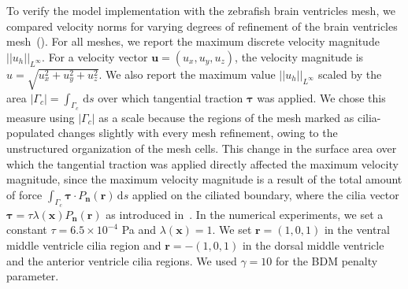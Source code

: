\documentclass[fleqn]{wlscirep}
\newcommand{\normlinf}[1]{{\vert\vert#1\vert\vert}_{L^{\infty}}}
\newcommand{\intGc}[1]{\int_{\Gamma_c}#1 \, \mathrm ds}
\newcommand{\Gc}{\Gamma_{c}}
\newcommand{\nn}{\mathbf{n}}
\newcommand{\rr}{\mathbf{r}}
\newcommand{\uu}{\mathbf{u}}
\newcommand{\xx}{\bm{x}}
\newcommand{\btau}{\bm{\tau}}
\begin{document}
To verify the model implementation with the zebrafish brain ventricles mesh,
we compared velocity norms for varying degrees of refinement of the brain ventricles mesh~().
For all meshes, we report the maximum discrete velocity magnitude $\normlinf{u_h}$.
For a velocity vector $\uu=(u_x, u_y, u_z)$, the velocity magnitude is
$u = \sqrt{u_x^2 + u_y^2 + u_z^2}$. We also report the maximum value
$\normlinf{u_h}$ scaled by the area $|\Gc|=\intGc{}$ over which tangential traction
$\btau$ was applied. We chose this measure using $|\Gc|$ as a scale because the regions
of the mesh marked as cilia-populated changes slightly with every mesh refinement,
owing to the unstructured organization of the mesh cells. This change in the surface
area over which the tangential traction was applied directly affected the maximum velocity magnitude,
since the maximum velocity magnitude is a result of the total amount of force
$\intGc{\btau\cdot P_{\nn}(\rr)}$ applied on the ciliated boundary, where the cilia
vector $\btau = \tau\lambda(\xx) P_{\nn}(\rr)$ as introduced in~.
In the numerical experiments, we set a constant $\tau = 6.5\times 10^{-4}$ Pa and
$\lambda(\xx)=1$. We set $\rr = (1, 0, 1)$ in the ventral middle ventricle cilia region
and $\rr = -(1, 0, 1)$ in the dorsal middle ventricle and the anterior ventricle cilia
regions. We used $\gamma=10$ for the BDM penalty parameter.
\end{document}
